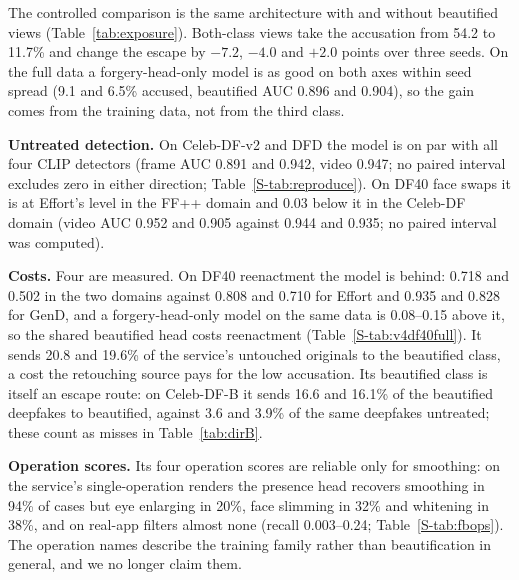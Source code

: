 \documentclass[conference]{IEEEtran}
\begin{document}
The controlled comparison is the same architecture with and without
beautified views (Table~\ref{tab:exposure}). Both-class views take the accusation from 54.2 to 11.7\% and change the escape by
$-7.2$, $-4.0$ and $+2.0$ points over three seeds. On the full data a forgery-head-only model is as good on both axes
within seed spread (9.1 and 6.5\% accused, beautified AUC 0.896 and 0.904), so the gain comes from the training data, not
from the third class.

\textbf{Untreated detection.} On Celeb-DF-v2 and DFD the model is on par with all four CLIP detectors (frame AUC 0.891 and
0.942, video 0.947; no paired interval excludes zero in either direction; Table~\ref{S-tab:reproduce}).
On DF40 face swaps it is at Effort's level in the FF++ domain and
0.03 below it in the Celeb-DF domain (video AUC 0.952 and 0.905 against 0.944 and 0.935; no paired interval was computed).

\textbf{Costs.} Four are measured. On DF40 reenactment the model is behind: 0.718 and 0.502 in the two domains against
0.808 and 0.710 for Effort and 0.935 and 0.828 for GenD, and a forgery-head-only model on the same data is 0.08--0.15 above
it, so the shared beautified head costs reenactment (Table~\ref{S-tab:v4df40full}).
It sends 20.8 and 19.6\% of the service's untouched originals to the beautified class,
a cost the retouching source pays for the low accusation. Its beautified class is itself an escape route: on Celeb-DF-B it
sends 16.6 and 16.1\% of the beautified deepfakes to beautified, against 3.6 and 3.9\% of the same deepfakes untreated; these
count as misses in Table~\ref{tab:dirB}.


\textbf{Operation scores.} Its four operation scores are reliable only for smoothing: on the
service's single-operation renders the presence head recovers smoothing in 94\% of cases but eye
enlarging in 20\%, face slimming in 32\% and whitening in 38\%,
and on real-app filters almost none (recall 0.003--0.24; Table~\ref{S-tab:fbops}).
The operation names describe the training family rather than beautification in general, and we no longer claim them.
\end{document}
